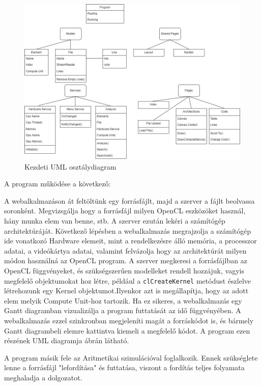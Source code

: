 
\begin{figure}[h]
\centering
\includegraphics[scale=0.4]{images/UML.jpg}
\caption{Kezdeti UML osztálydiagram}
\label{fig:uml}
\end{figure}

A program működése a következő:

A webalkalmazáson át feltöltünk egy forrásfájlt, majd a szerver a fájlt beolvassa soronként. Megvizsgálja hogy a forrásfájl milyen OpenCL eszközöket használ, hány munka elem van benne, stb. A szerver ezután lekéri a számítógép architektúráját. Következő lépésben a webalkalmazás megrajzolja a számítógép ide vonatkozó Hardware elemeit, mint a rendelkezésre álló memória, a processzor adatai, a videókártya adatai, valamint felvázolja hogy az architektúrát milyen módon használná az OpenCL program. A szerver megkeresi a forrásfájlban az OpenCL függvényeket, és szükségszerűen modelleket rendell hozzájuk, vagyis megfelelő objektumokat hoz létre, például a \texttt{clCreateKernel} metódust észlelve létrehozunk egy Kernel objektumot.Ilyenkor azt is megállapítja, hogy az adott elem melyik Compute Unit-hoz tartozik. Ha ez sikeres, a webalkalmazás egy Gantt diagramban vizualizálja a program futtatását az idő függvényében. A webalkalmazás ezzel szinkronban megjeleníti magát a forráskódot is, és bármely Gantt diagrambeli elemre kattintva kiemeli a megfelelő kódot. A program ezen részének UML diagramja  ábrán látható.

A program másik fele az Aritmetikai szimulációval foglalkozik. Ennek szükséglete lenne a forrásfájl "lefordítása" és futtatása, viszont a fordítás teljes folyamata meghaladja a dolgozatot.

